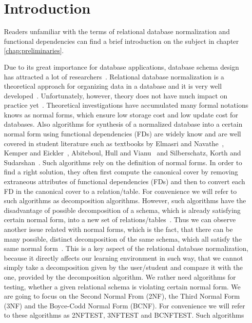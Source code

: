 \chapter{Introduction}
\label{chap:introduction}
Readers unfamiliar with the terms of relational database normalization and 
functional dependencies can find a brief introduction on the subject in
chapter \ref{chap:preliminaries}. 

Due to its great importance for database applications, database schema design has
attracted a lot of researchers~\cite{p1}. Relational database normalization is a 
theoretical approach for organizing data in a database and it is very well developed~\cite{p8}.
Unfortunately, however, theory does not have much impact on practice yet~\cite{p1}. 
Theoretical investigations have accumulated many formal
notations knows as normal forms, which ensure low storage cost and low update cost
for databases.
Also algorithms for synthesis of a normalized database into a certain normal form using 
functional dependencies (FDs) are widely know 
and are well covered in student literature such as textbooks by Elmasri and Navathe~\cite{bdb1}, 
Kemper and Eickler~\cite{bdb2}, Abiteboul, Hull and Vianu~\cite{bdb3}
and Silberschatz, Korth and Sudarshan~\cite{bdb4}.
Such algorithms rely on the definition of normal forms. In order to find a right 
solution, they often first compute the canonical cover by removing extraneous 
attributes of functional dependencies (FDs) and then to convert each FD in the 
canonical cover to a relation/table. For convenience we will refer to such algorithms as
decomposition algorithms. However, such algorithms have the 
disadvantage of possible decomposition of a schema, which is already satisfying 
certain normal form, into a new set of relations/tables~\cite{p4}. Thus we can observe 
another issue related with normal forms, which is the fact, that there can be many 
possible, distinct decomposition of the same schema, which all satisfy the same 
normal form~\cite{bdb4}. 
This is a key aspect of the relational database normalization, because it directly 
affects our learning environment in such way, that we cannot simply take a decomposition given 
by the user/student and compare it with the one, provided by the decomposition algorithm. 
We rather need algorithms for testing, whether a given relational schema is violating 
certain normal form. We are going to focus on the Second Normal From (2NF), 
the Third Normal Form (3NF) and the Boyce-Codd Normal Form (BCNF). For convenience we 
will refer to these algorithms as 2NFTEST, 3NFTEST and BCNFTEST. Such algorithms 
